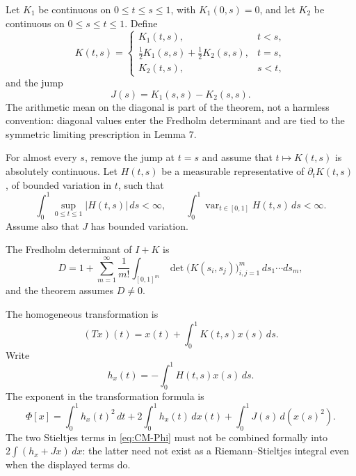 Let \(K_1\) be continuous on \(0\le t\le s\le1\), with \(K_1(0,s)=0\), and let \(K_2\) be continuous on \(0\le s\le t\le1\).  Define
\begin{equation}
 K(t,s)=
 \begin{cases}
 K_1(t,s),&t<s,\\
 \frac12K_1(s,s)+\frac12K_2(s,s),&t=s,\\
 K_2(t,s),&s<t,
 \end{cases}
 \tag{0.3}\label{eq:CM-K}
\end{equation}
and the jump
\begin{equation}
 J(s)=K_1(s,s)-K_2(s,s).
 \tag{0.4}\label{eq:CM-J}
\end{equation}
The arithmetic mean on the diagonal is part of the theorem, not a harmless convention: diagonal values enter the Fredholm determinant and are tied to the symmetric limiting prescription in Lemma 7.

For almost every \(s\), remove the jump at \(t=s\) and assume that \(t\mapsto K(t,s)\) is absolutely continuous.  Let \(H(t,s)\) be a measurable representative of \(\partial_tK(t,s)\), of bounded variation in \(t\), such that
\begin{equation}
 \int_0^1\sup_{0\le t\le1}|H(t,s)|\,ds<\infty,
 \qquad
 \int_0^1\operatorname{var}_{t\in[0,1]}H(t,s)\,ds<\infty.
 \tag{0.6C}\label{eq:CM-Hbounds}
\end{equation}
Assume also that \(J\) has bounded variation.

The Fredholm determinant of \(I+K\) is
\begin{equation}
 D=1+\sum_{m=1}^{\infty}\frac1{m!}
 \int_{[0,1]^m}\det\bigl(K(s_i,s_j)\bigr)_{i,j=1}^m
 \,ds_1\cdots ds_m,
 \tag{0.5}\label{eq:CM-D}
\end{equation}
and the theorem assumes \(D\ne0\).

The homogeneous transformation is
\begin{equation}
 (Tx)(t)=x(t)+\int_0^1K(t,s)x(s)\,ds.
 \tag{0.7}\label{eq:CM-T}
\end{equation}
Write
\[
 h_x(t)=-\int_0^1H(t,s)x(s)\,ds.
\]
The exponent in the transformation formula is
\begin{equation}
 \Phi[x]
 =\int_0^1h_x(t)^2\,dt
 +2\int_0^1h_x(t)\,dx(t)
 +\int_0^1J(s)\,d(x(s)^2).
 \tag{0.9}\label{eq:CM-Phi}
\end{equation}
The two Stieltjes terms in \eqref{eq:CM-Phi} must not be combined formally into \(2\int(h_x+Jx)\,dx\): the latter need not exist as a Riemann--Stieltjes integral even when the displayed terms do.

